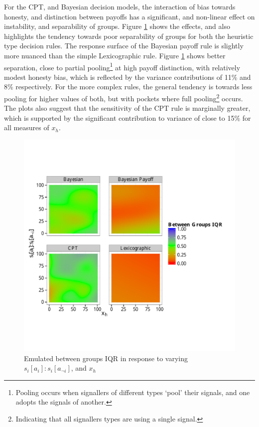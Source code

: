 For the \ac{CPT}, and Bayesian decision models, the interaction of bias towards honesty, and distinction between payoffs has a significant, and non-linear effect on instability, and separability of groups. Figure \ref{fig:emulated_payoff_group_iqr} shows the effects, and also highlights the tendency towards poor separability of groups for both the heuristic type decision rules. The response surface of the Bayesian payoff rule is slightly more nuanced than the simple Lexicographic rule. Figure \ref{fig:emulated_payoff_group_iqr} shows better separation, close to partial pooling\footnote{Pooling occurs when signallers of different types `pool' their signals, and one adopts the signals of another.} at high payoff distinction, with relatively modest honesty bias, which is reflected by the variance contributions of 11\% and 8\% respectively.  For the more complex rules, the general tendency is towards less pooling for higher values of both, but with pockets where full pooling\footnote{Indicating that all signallers types are using a single signal.} occurs.  The plots also suggest that the sensitivity of the \ac{CPT} rule is marginally greater, which is supported by the significant contribution to variance of close to 15\% for all measures of \(x_{h}\).

\begin{figure}[H]
\begin{adjustbox}{center}\includegraphics[width=119mm]{figures/unfixed_emu_payoff_honesty_group_iqr}\end{adjustbox}
\caption{Emulated between groups IQR in response to varying \(s_{i}[a_{i}]:s_{i}[a_{\neg i}]\), and \(x_{h}\)}
\label{fig:emulated_payoff_group_iqr}
\end{figure}
